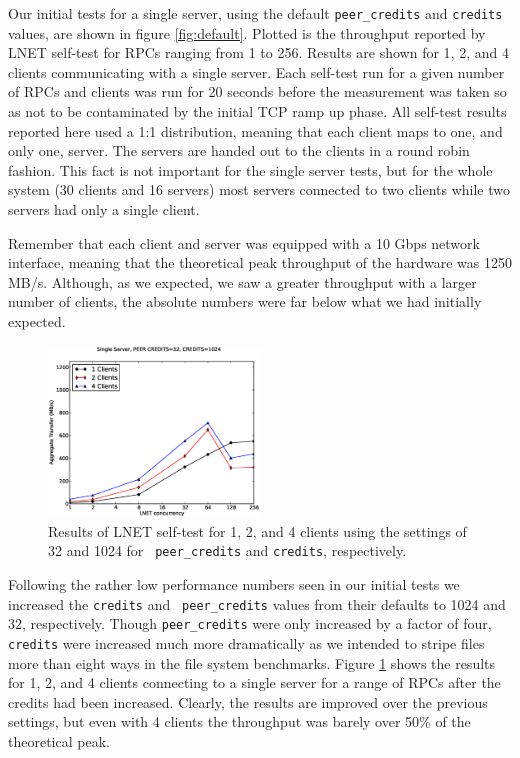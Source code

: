 \documentclass[]{sigplan-proc}
\begin{document}
Our initial tests for a single server, using the default {\tt peer\_credits} and {\tt credits} values, are
shown in figure \ref{fig:default}. Plotted is the throughput reported by LNET self-test for RPCs ranging from
1 to 256. Results are shown for 1, 2, and 4 clients communicating with a single server. Each self-test run for
a given number of RPCs and clients was run for 20 seconds before the measurement was taken so as not to be
contaminated by the initial TCP ramp up phase. All self-test results reported here used a 1:1 distribution,
meaning that each client maps to one, and only one, server. The servers are handed out to the clients in a
round robin fashion. This fact is not important for the single server tests, but for the whole system (30
clients and 16 servers) most servers connected to two clients while two servers had only a single client.

Remember that each client and server was equipped with a 10 Gbps network interface, meaning that the
theoretical peak throughput of the hardware was 1250 MB/s. Although, as we expected, we saw a greater
throughput with a larger number of clients, the absolute numbers were far below what we had initially
expected.

\begin{figure}
\centering
\includegraphics[width=0.50\textwidth]{figures/32pc_plot.eps}
\caption{Results of LNET self-test for 1, 2, and 4 clients using the settings of 32 and 1024 for {\tt
    peer\_credits} and {\tt credits}, respectively.}
\label{fig:32pc}
\end{figure}

Following the rather low performance numbers seen in our initial tests we increased the {\tt credits} and {\tt
  peer\_credits} values from their defaults to 1024 and 32, respectively. Though {\tt peer\_credits} were only
increased by a factor of four, {\tt credits} were increased much more dramatically as we intended to stripe
files more than eight ways in the file system benchmarks. Figure \ref{fig:32pc} shows the results for 1, 2,
and 4 clients connecting to a single server for a range of RPCs after the credits had been increased. Clearly,
the results are improved over the previous settings, but even with 4 clients the throughput was barely over
50\% of the theoretical peak.  
\end{document}
